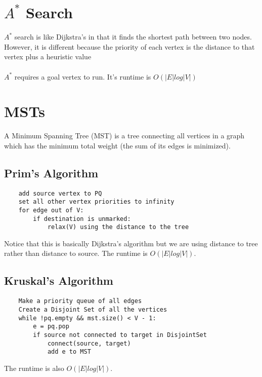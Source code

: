 \documentclass{article}
\begin{document}
\section{$A^*$ Search}
$A^*$ search is like Dijkstra's in that it finds the shortest path between two nodes.
However, it is different because the priority of each vertex is the distance to that vertex plus a heuristic value
\\\\
$A^*$ requires a goal vertex to run. It's runtime is $O(|E|log|V|)$
\section{MSTs}
A Minimum Spanning Tree (MST) is a tree connecting all vertices in a graph which has the minimum total weight (the sum of its edges is minimized).
\subsection{Prim's Algorithm}
\begin{lstlisting}
    add source vertex to PQ
    set all other vertex priorities to infinity
    for edge out of V:
        if destination is unmarked:
            relax(V) using the distance to the tree
\end{lstlisting}
Notice that this is basically Dijkstra's algorithm but we are using distance to tree rather than distance to source.
The runtime is $O(|E|log|V|)$.
\subsection{Kruskal's Algorithm}
\begin{lstlisting}
    Make a priority queue of all edges
    Create a Disjoint Set of all the vertices
    while !pq.empty && mst.size() < V - 1:
        e = pq.pop
        if source not connected to target in DisjointSet
            connect(source, target)
            add e to MST
\end{lstlisting}
The runtime is also $O(|E|log|V|)$.
\end{document}

